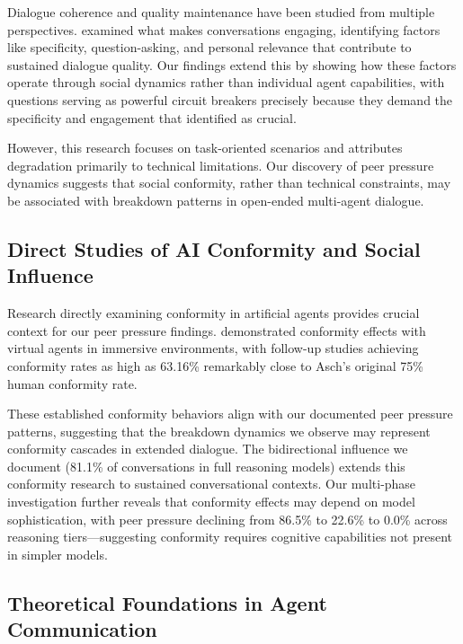 \documentclass[11pt,letterpaper]{article}
\newcommand{\exponedataPeerPressurePercentage}{86.5\%}
\newcommand{\exponedataBidirectionalPercentage}{81.1\%}
\newcommand{\exptwoPeerPressurePercentage}{22.6\%}
\newcommand{\expthreePeerPressurePercentage}{0.0\%}
\begin{document}
Dialogue coherence and quality maintenance have been studied from multiple perspectives. \citet{see2019makes} examined what makes conversations engaging, identifying factors like specificity, question-asking, and personal relevance that contribute to sustained dialogue quality. Our findings extend this by showing how these factors operate through social dynamics rather than individual agent capabilities, with questions serving as powerful circuit breakers precisely because they demand the specificity and engagement that \citet{see2019makes} identified as crucial.

However, this research focuses on task-oriented scenarios and attributes degradation primarily to technical limitations. Our discovery of peer pressure dynamics suggests that social conformity, rather than technical constraints, may be associated with breakdown patterns in open-ended multi-agent dialogue.

\subsection{Direct Studies of AI Conformity and Social Influence}

Research directly examining conformity in artificial agents provides crucial context for our peer pressure findings. \citet{kyrlitsias2018conformity} demonstrated conformity effects with virtual agents in immersive environments, with follow-up studies achieving conformity rates as high as 63.16\% remarkably close to Asch's original 75\% human conformity rate.

These established conformity behaviors align with our documented peer pressure patterns, suggesting that the breakdown dynamics we observe may represent conformity cascades in extended dialogue. The bidirectional influence we document (\exponedataBidirectionalPercentage{} of conversations in full reasoning models) extends this conformity research to sustained conversational contexts. Our multi-phase investigation further reveals that conformity effects may depend on model sophistication, with peer pressure declining from \exponedataPeerPressurePercentage{} to \exptwoPeerPressurePercentage{} to \expthreePeerPressurePercentage{} across reasoning tiers—suggesting conformity requires cognitive capabilities not present in simpler models.

\subsection{Theoretical Foundations in Agent Communication}
\end{document}
